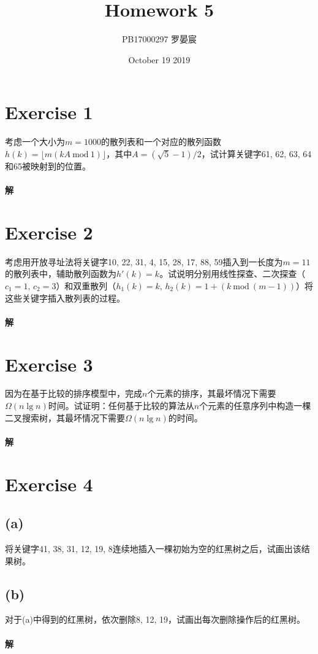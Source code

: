 \documentclass{article}
\title{Homework 5}
\author{PB17000297 罗晏宸}
\date{October 19 2019}
\begin{document}
\maketitle

\section*{Exercise 1}
考虑一个大小为$m = 1000$的散列表和一个对应的散列函数$h(k) = \lfloor m(kA\ \text{mod}\ 1) \rfloor$，其中$A = (\sqrt{5} − 1)/2$，试计算关键字61, 62, 63, 64和65被映射到的位置。
\paragraph{解}

\section*{Exercise 2}
考虑用开放寻址法将关键字10, 22, 31, 4, 15, 28, 17, 88, 59插入到一长度为$m = 11$的散列表中，辅助散列函数为$h'(k) = k$。试说明分别用线性探查、二次探查（$c_1 = 1,\,c_2 = 3$）和双重散列（$h_1(k) = k,\,
h_2(k) = 1 + (k\ \text{mod}\ (m − 1))$）将这些关键字插入散列表的过程。

\paragraph{解}

\section*{Exercise 3}
因为在基于比较的排序模型中，完成$n$个元素的排序，其最坏情况下需要$\Omega(n \lg{n})$时间。试证明：任何基于比较的算法从$n$个元素的任意序列中构造一棵二叉搜索树，其最坏情况下需要$\Omega(n \lg{n})$的时间。

\paragraph{解}

\section*{Exercise 4}
\subsection*{(a)}
将关键字41, 38, 31, 12, 19, 8连续地插入一棵初始为空的红黑树之后，试画出该结果树。
\subsection*{(b)}
对于(a)中得到的红黑树，依次删除8, 12, 19，试画出每次删除操作后的红黑树。
\paragraph{解}
\end{document}
